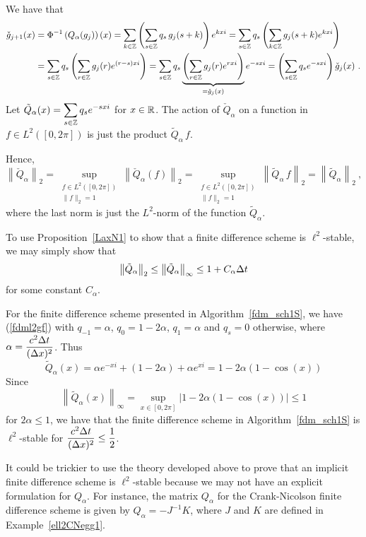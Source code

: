 We have that
\begin{align*}
\check{g}_{j+1}(x) &= \Phi^{-1}\left(Q_\alpha(g_j)\right)(x)
= \sum_{k\in \mathbb{Z}} \left(\sum_{s\in \mathbb{Z}} q_s\, g_j(s+k) \right) e^{kx i}
= \sum_{s\in \mathbb{Z}} q_s \left( \sum_{k\in \mathbb{Z}}  g_j(s+k)  e^{kx i} \right) \\
& = \sum_{s\in \mathbb{Z}} q_s \left( \sum_{r\in \mathbb{Z}}  g_j(r)  e^{(r-s)x i} \right)
= \sum_{s\in \mathbb{Z}} q_s
\underbrace{\left( \sum_{r\in \mathbb{Z}}  g_j(r)  e^{rx i}\right)}_{=\check{g}_j(x)}
  e^{-sx i}
= \left( \sum_{s\in \mathbb{Z}} q_s e^{-sx i} \right) \check{g}_j(x) \ .
\end{align*}
Let $\displaystyle \tilde{Q}_\alpha(x) = \sum_{s\in \mathbb{Z}} q_s e^{-sx i}$ for
$x \in \mathbb{R}$.  The action of $\check{Q}_\alpha$ on a function in
$f \in L^2([0,2\pi])$ is just the product $\tilde{Q}_\alpha\,f$.

Hence,
\[
\left\| \check{Q}_\alpha \right\|_2
= \sup_{\substack{f\in L^2([0,2\pi])\\ \|f\|_2=1}}
\left\| \check{Q}_\alpha(f) \right\|_2
= \sup_{\substack{f\in L^2([0,2\pi])\\ \|f\|_2=1}}
\left\| \tilde{Q}_\alpha \, f \right\|_2
= \left\|\tilde{Q}_\alpha \right\|_2 \ ,
\]
where the last norm is just the $L^2$-norm of the function
$\tilde{Q}_\alpha$.

To use Proposition~\ref{LaxN1} to show that a finite difference scheme
is $\ell^2$-stable, we may simply show that
\[
\left\| \tilde{Q}_\alpha \right\|_2 \leq
\left\| \tilde{Q}_\alpha \right\|_\infty \leq 1 + C_\alpha \Delta{t}
\]
for some constant $C_\alpha$.

\begin{egg}
For the finite difference scheme presented in
Algorithm~\ref{fdm_sch1S}, we have (\ref{fdml2gf}) with
$q_{-1} = \alpha$, $q_0 = 1 - 2\alpha$, $q_1 = \alpha$ and $q_s = 0$
otherwise, where
$\displaystyle \alpha = \frac{c^2\Delta{t}}{(\Delta{x})^2}$.  Thus
\[
  \tilde{Q}_\alpha(x) = \alpha e^{-xi} + (1-2\alpha) + \alpha e^{xi}
= 1 - 2\alpha(1 -\cos(x))
\]
Since
\[
  \left\|\tilde{Q}_\alpha(x)\right\|_\infty =
  \sup_{x \in [0,2\pi]}|1 - 2\alpha(1 -\cos(x))| \leq 1
\]
for $2\alpha \leq 1$, we have that the finite difference scheme in 
Algorithm~\ref{fdm_sch1S} is $\ell^2$-stable for
$\displaystyle \frac{c^2\Delta{t}}{(\Delta{x})^2} \leq \frac{1}{2}$.
\end{egg}

It could be trickier to use the theory developed above to prove that
an implicit finite difference scheme is $\ell^2$-stable because we may
not have an explicit formulation for $Q_\alpha$.  For instance, the
matrix $Q_\alpha$ for the Crank-Nicolson finite difference scheme is
given by $Q_\alpha = -J^{-1} K$, where $J$ and $K$ are defined in
Example~\ref{ell2CNegg1}.


